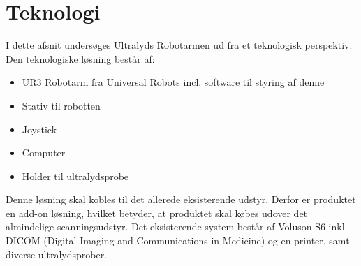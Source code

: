 \chapter{Teknologi} \label{Teknologi}
I dette afsnit undersøges Ultralyds Robotarmen ud fra et teknologisk perspektiv.  \\
Den teknologiske løsning består af:
\begin{itemize}
\item UR3 Robotarm fra Universal Robots incl. software til styring af denne
\item Stativ til robotten
\item Joystick
\item Computer
\item Holder til ultralydsprobe
\end{itemize}
Denne løsning skal kobles til det allerede eksisterende udstyr. Derfor er produktet en add-on løsning, hvilket betyder, at produktet skal købes udover det almindelige scanningsudstyr. Det eksisterende system består af Voluson S6 inkl. DICOM (Digital Imaging and Communications in Medicine) og en printer, samt diverse ultralydsprober.  

